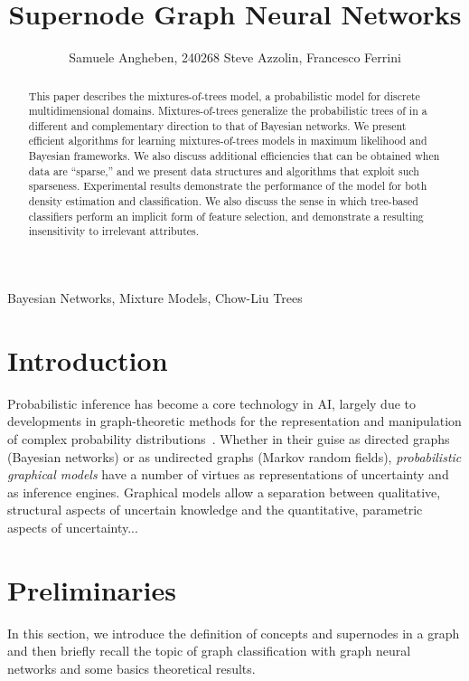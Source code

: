 \documentclass[twoside,11pt]{article}
\begin{document}
\title{Supernode Graph Neural Networks}

\author{\name Samuele Angheben, 240268
        \AND
       \name Steve Azzolin, Francesco Ferrini
   }

\maketitle

\begin{abstract}%
This paper describes the mixtures-of-trees model, a probabilistic
model for discrete multidimensional domains.  Mixtures-of-trees
generalize the probabilistic trees of \citet{chow:68}
in a different and complementary direction to that of Bayesian networks.
We present efficient algorithms for learning mixtures-of-trees
models in maximum likelihood and Bayesian frameworks.
We also discuss additional efficiencies that can be
obtained when data are ``sparse,'' and we present data
structures and algorithms that exploit such sparseness.
Experimental results demonstrate the performance of the
model for both density estimation and classification.
We also discuss the sense in which tree-based classifiers
perform an implicit form of feature selection, and demonstrate
a resulting insensitivity to irrelevant attributes.
\end{abstract}

\begin{keywords}
  Bayesian Networks, Mixture Models, Chow-Liu Trees
\end{keywords}

\section{Introduction}

Probabilistic inference has become a core technology in AI,
largely due to developments in graph-theoretic methods for the
representation and manipulation of complex probability
distributions~\citep{pearl:88}.  Whether in their guise as
directed graphs (Bayesian networks) or as undirected graphs (Markov
random fields), \emph{probabilistic graphical models} have a number
of virtues as representations of uncertainty and as inference engines.
Graphical models allow a separation between qualitative, structural
aspects of uncertain knowledge and the quantitative, parametric aspects
of uncertainty...\\

\section{Preliminaries} %
\label{sec:preliminaries}
In this section, we introduce the definition of concepts and supernodes in a graph and then briefly recall the topic of graph classification with graph neural networks and some basics theoretical results.
\end{document}
